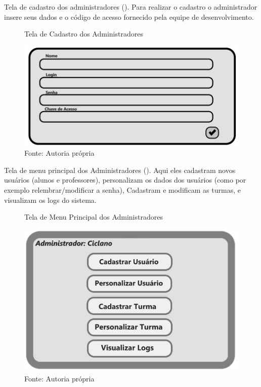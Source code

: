 \documentclass{utfpr-pg}
\begin{document}
    Tela de cadastro dos administradores (). Para realizar o cadastro o administrador insere seus dados e o código de acesso fornecido pela equipe de desenvolvimento.
    \begin{figure}[H]
            \centering
            \captionsetup{width=0.9\textwidth}
            \caption{Tela de Cadastro dos Administradores}
            \includegraphics[width=\linewidth]{fotos/10.jpg}
            \caption*{Fonte: Autoria própria}
            \label{fig:10}
        \end{figure}
    Tela de menu principal dos Administradores (). Aqui eles cadastram novos usuários (alunos e professores), personalizam os dados dos usuários (como por exemplo relembrar/modificar a senha), Cadastram e modificam as turmas, e visualizam os logs do sistema.
     \begin{figure}[H]
            \centering
            \captionsetup{width=0.9\textwidth}
            \caption{Tela de Menu Principal dos Administradores}
            \includegraphics[width=\linewidth]{fotos/11.jpg}
            \caption*{Fonte: Autoria própria}
            \label{fig:11}
        \end{figure}
    
\end{document}
